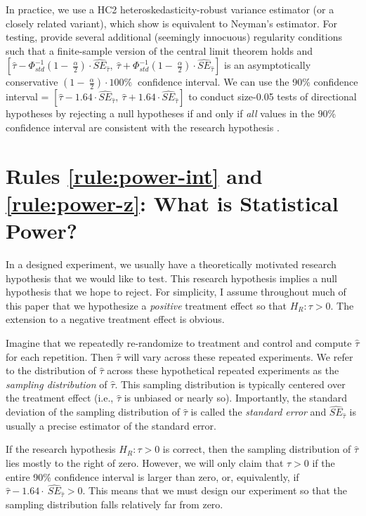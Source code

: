 \documentclass[12pt]{article}
\begin{document}
In practice, we use a HC2 heteroskedasticity-robust variance estimator (or a closely related variant), which \cite{Samii2012} show is equivalent to Neyman's estimator. 
For testing, \cite{Li2017} provide several additional (seemingly innocuous) regularity conditions such that a finite-sample version of the central limit theorem holds and $\left\lbrack \widehat{\tau} - \Phi_{std}^{- 1}\left( 1 - \ \frac{\alpha}{2} \right) \cdot {\widehat{SE}}_{\widehat{\tau}},\ \widehat{\tau} + \Phi_{std}^{- 1}\left( 1 - \ \frac{\alpha}{2} \right) \cdot {\widehat{SE}}_{\widehat{\tau}} \right\rbrack$ is an asymptotically conservative $\left( 1 - \ \frac{\alpha}{2} \right) \cdot 100\%\ $ confidence interval. 
We can use the 90\% confidence interval = $\left\lbrack \widehat{\tau} - 1.64 \cdot {\widehat{SE}}_{\widehat{\tau}},\ \widehat{\tau} + 1.64 \cdot {\widehat{SE}}_{\widehat{\tau}} \right\rbrack$ to conduct size-0.05 tests of directional hypotheses by rejecting a null hypotheses if and only if \emph{all} values in the 90\% confidence interval are consistent with the research hypothesis \citep{Rainey2014, McCaskey2015}.

\section*{Rules \ref{rule:power-int} and \ref{rule:power-z}: What is Statistical Power?}

In a designed experiment, we usually have a theoretically motivated research hypothesis that we would like to test. 
This research hypothesis implies a null hypothesis that we hope to reject. 
For simplicity, I assume throughout much of this paper that we hypothesize a \emph{positive} treatment effect so that $H_{R}:\tau > 0$. 
The extension to a negative treatment effect is obvious.

Imagine that we repeatedly re-randomize to treatment and control and compute $\widehat{\tau}$ for each repetition. 
Then $\widehat{\tau}$ will vary across these repeated experiments. 
We refer to the distribution of $\widehat{\tau}$ across these hypothetical
repeated experiments as the \emph{sampling distribution} of $\widehat{\tau}$. 
This sampling distribution is typically centered over the treatment effect (i.e., $\widehat{\tau}$ is unbiased or nearly so). 
Importantly, the standard deviation of the sampling distribution of $\widehat{\tau}$ is called the \emph{standard error} and ${\widehat{SE}}_{\widehat{\tau}}$ is usually a precise estimator of the standard error.

If the research hypothesis $H_{R}:\tau > 0$ is correct, then the sampling distribution of $\widehat{\tau}$ lies mostly to the right of zero. 
However, we will only claim that $\tau > 0$ if the entire 90\% confidence interval is larger than zero, or, equivalently, if $\widehat{\tau} - 1.64 \cdot \ {\widehat{SE}}_{\widehat{\tau}} > 0.$
This means that we must design our experiment so that the sampling distribution falls relatively far from zero.
\end{document}
